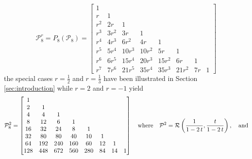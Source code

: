 \begin{example}
\begin{displaymath}
\mathcal{P}_{8}^{r} = P_{8}\left( \mathcal{P}_{8}\right) = \left[\begin{matrix}1 &   &   &   &   &   &   &  \\r & 1 &   &   &   &   &   &  \\r^{2} & 2 r & 1 &   &   &   &   &  \\r^{3} & 3 r^{2} & 3 r & 1 &   &   &   &  \\r^{4} & 4 r^{3} & 6 r^{2} & 4 r & 1 &   &   &  \\r^{5} & 5 r^{4} & 10 r^{3} & 10 r^{2} & 5 r & 1 &   &  \\r^{6} & 6 r^{5} & 15 r^{4} & 20 r^{3} & 15 r^{2} & 6 r & 1 &  \\r^{7} & 7 r^{6} & 21 r^{5} & 35 r^{4} & 35 r^{3} & 21 r^{2} & 7 r & 1\end{matrix}\right]
\end{displaymath}
the special cases $r=\frac{1}{2}$ and $r=\frac{1}{3}$ have been illustrated
in Section \ref{sec:introduction} while $r=2$ and $r=-1$ yield
\begin{displaymath}
\mathcal{P}_{8}^{2} = \left[\begin{matrix}1 &  &  &  &  &  &  & \\2 & 1 &  &  &  &  &  & \\4 & 4 & 1 &  &  &  &  & \\8 & 12 & 6 & 1 &  &  &  & \\16 & 32 & 24 & 8 & 1 &  &  & \\32 & 80 & 80 & 40 & 10 & 1 &  & \\64 & 192 & 240 & 160 & 60 & 12 & 1 & \\128 & 448 & 672 & 560 & 280 & 84 & 14 & 1\end{matrix}\right]
\quad\text{where}\quad\mathcal{P}^{2} = \mbox{$\mathcal{R}$}\left(\frac{1}{1-2\,t},\frac{t}{1-2\,t} \right),
\quad\text{and}
\end{displaymath}

\end{example}
